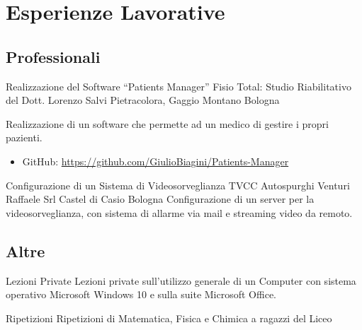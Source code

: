 %
%
%
%
%
%



\section{Esperienze Lavorative}

\subsection{Professionali}

{Realizzazione del Software ``Patients Manager''}
{Fisio Total: Studio Riabilitativo del Dott. Lorenzo Salvi}
{Pietracolora, Gaggio Montano}
{Bologna}
{Realizzazione di un software che permette ad un medico di gestire i propri
pazienti.
\begin{itemize}
	\item GitHub: \url{https://github.com/GiulioBiagini/Patients-Manager}
\end{itemize}}

{Configurazione di un Sistema di Videosorveglianza TVCC}
{Autospurghi Venturi Raffaele Srl}
{Castel di Casio}
{Bologna}
{Configurazione di un server per la videosorveglianza, con sistema di allarme
via mail e streaming video da remoto.}



\subsection{Altre}

{Lezioni Private}
{}
{}
{}
{Lezioni private sull'utilizzo generale di un Computer con sistema operativo
Microsoft Windows 10 e sulla suite Microsoft Office.}

{Ripetizioni}
{}
{}
{}
{Ripetizioni di Matematica, Fisica e Chimica a ragazzi del Liceo}

